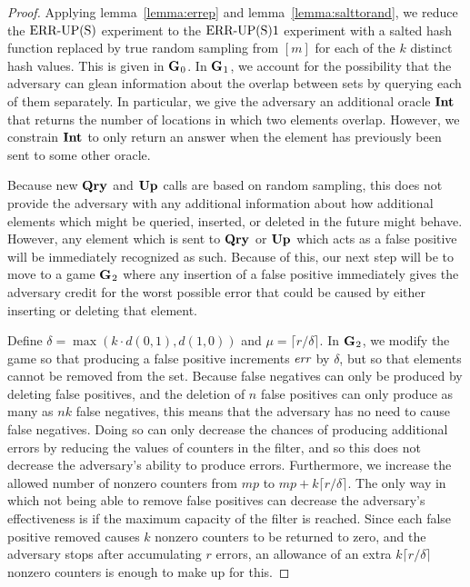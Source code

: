 \begin{proof}
Applying lemma~\ref{lemma:errep} and lemma~\ref{lemma:salttorand}, we reduce the $\textnormal{ERR\mbox{-}UP(S)}$ experiment to the $\textnormal{ERR\mbox{-}UP(S)}1$ experiment with a salted hash function replaced by true random sampling from $[m]$ for each of the $k$ distinct hash values. This is given in $\mathbf{G}\hspace{0.5pt}_0$. In $\mathbf{G}\hspace{0.5pt}_1$, we account for the possibility that the adversary can glean information about the overlap between sets by querying each of them separately. In particular, we give the adversary an additional oracle $\mathbf{Int}\hspace{0.5pt}$ that returns the number of locations in which two elements overlap. However, we constrain $\mathbf{Int}\hspace{0.5pt}$ to only return an answer when the element has previously been sent to some other oracle.

Because new $\mathbf{Qry}\hspace{0.5pt}$ and $\mathbf{Up}\hspace{0.5pt}$ calls are based on random sampling, this does not provide the adversary with any additional information about how additional elements which might be queried, inserted, or deleted in the future might behave. However, any element which is sent to $\mathbf{Qry}\hspace{0.5pt}$ or $\mathbf{Up}\hspace{0.5pt}$ which acts as a false positive will be immediately recognized as such. Because of this, our next step will be to move to a game $\mathbf{G}\hspace{0.5pt}_2$ where any insertion of a false positive immediately gives the adversary credit for the worst possible error that could be caused by either inserting or deleting that element.

Define $\delta = \max(k \cdot d(0,1), d(1,0))$ and $\mu = \lceil r/\delta \rceil$. In $\mathbf{G}\hspace{0.5pt}_2$, we modify the game so that producing a false positive increments $\textit{err}$ by $\delta$, but so that elements cannot be removed from the set. Because false negatives can only be produced by deleting false positives, and the deletion of $n$ false positives can only produce as many as $nk$ false negatives, this means that the adversary has no need to cause false negatives. Doing so can only decrease the chances of producing additional errors by reducing the values of counters in the filter, and so this does not decrease the adversary's ability to produce errors. Furthermore, we increase the allowed number of nonzero counters from $mp$ to $mp + k\lceil r/\delta \rceil$. The only way in which not being able to remove false positives can decrease the adversary's effectiveness is if the maximum capacity of the filter is reached. Since each false positive removed causes $k$ nonzero counters to be returned to zero, and the adversary stops after accumulating $r$ errors, an allowance of an extra $k\lceil r/\delta \rceil$ nonzero counters is enough to make up for this.


\end{proof}
